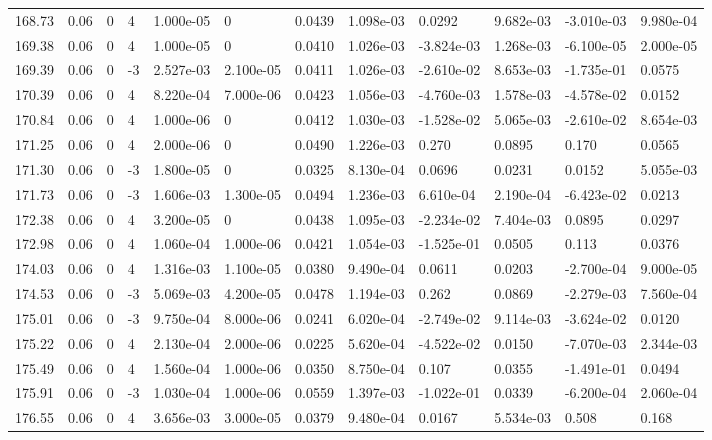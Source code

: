 \documentclass[preview]{standalone}
\begin{document}
{{{{{{{{{\begin{tabular}{L{1.2cm}C{1.2cm} C{0.3cm}C{0.5cm} C{1.4cm}C{1.4cm} C{1.4cm}C{1.4cm} C{1.6cm}C{1.6cm} C{1.6cm}C{1.6cm}}
  168.73  &  0.06  & 0     &  4 &  1.000e-05  & 0  &  0.0439&   1.098e-03& 0.0292 & 9.682e-03   &  -3.010e-03 & 9.980e-04  \\ 
  169.38  &  0.06  & 0     &  4 &  1.000e-05  & 0  &  0.0410&   1.026e-03& -3.824e-03 & 1.268e-03   &  -6.100e-05 & 2.000e-05  \\ 
  169.39  &  0.06  & 0     & -3 &  2.527e-03  & 2.100e-05  &  0.0411&   1.026e-03& -2.610e-02 & 8.653e-03   &  -1.735e-01 & 0.0575  \\ 
  170.39  &  0.06  & 0     &  4 &  8.220e-04  & 7.000e-06  &  0.0423&   1.056e-03& -4.760e-03 & 1.578e-03   &  -4.578e-02 & 0.0152  \\ 
  170.84  &  0.06  & 0     &  4 &  1.000e-06  & 0  &  0.0412&   1.030e-03& -1.528e-02 & 5.065e-03   &  -2.610e-02 & 8.654e-03  \\ 
  171.25  &  0.06  & 0     &  4 &  2.000e-06  & 0  &  0.0490&   1.226e-03& 0.270 & 0.0895   &  0.170 & 0.0565  \\ 
  171.30  &  0.06  & 0     & -3 &  1.800e-05  & 0  &  0.0325&   8.130e-04& 0.0696 & 0.0231   &  0.0152 & 5.055e-03  \\ 
  171.73  &  0.06  & 0     & -3 &  1.606e-03  & 1.300e-05  &  0.0494&   1.236e-03& 6.610e-04 & 2.190e-04   &  -6.423e-02 & 0.0213  \\ 
  172.38  &  0.06  & 0     &  4 &  3.200e-05  & 0  &  0.0438&   1.095e-03& -2.234e-02 & 7.404e-03   &  0.0895 & 0.0297  \\ 
  172.98  &  0.06  & 0     &  4 &  1.060e-04  & 1.000e-06  &  0.0421&   1.054e-03& -1.525e-01 & 0.0505   &  0.113 & 0.0376  \\ 
  174.03  &  0.06  & 0     &  4 &  1.316e-03  & 1.100e-05  &  0.0380&   9.490e-04& 0.0611 & 0.0203   &  -2.700e-04 & 9.000e-05  \\ 
  174.53  &  0.06  & 0     & -3 &  5.069e-03  & 4.200e-05  &  0.0478&   1.194e-03& 0.262 & 0.0869   &  -2.279e-03 & 7.560e-04  \\ 
  175.01  &  0.06  & 0     & -3 &  9.750e-04  & 8.000e-06  &  0.0241&   6.020e-04& -2.749e-02 & 9.114e-03   &  -3.624e-02 & 0.0120  \\ 
  175.22  &  0.06  & 0     &  4 &  2.130e-04  & 2.000e-06  &  0.0225&   5.620e-04& -4.522e-02 & 0.0150   &  -7.070e-03 & 2.344e-03  \\ 
  175.49  &  0.06  & 0     &  4 &  1.560e-04  & 1.000e-06  &  0.0350&   8.750e-04& 0.107 & 0.0355   &  -1.491e-01 & 0.0494  \\ 
  175.91  &  0.06  & 0     & -3 &  1.030e-04  & 1.000e-06  &  0.0559&   1.397e-03& -1.022e-01 & 0.0339   &  -6.200e-04 & 2.060e-04  \\ 
  176.55  &  0.06  & 0     &  4 &  3.656e-03  & 3.000e-05  &  0.0379&   9.480e-04& 0.0167 & 5.534e-03   &  0.508 & 0.168  \\ 
\hline 
\end{tabular} 

}}}}}}}}}
\end{document}
